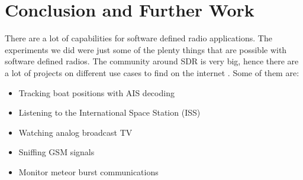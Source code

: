\documentclass[conference]{IEEEtran}
\begin{document}
\section{Conclusion and Further Work}
There are a lot of capabilities for software defined radio applications. The experiments we did were just some of the plenty things that are possible with software defined radios. The community around SDR is very big, hence there are a lot of projects on different use cases to find on the internet \cite{rtl-sdr}. Some of them are:

\begin{itemize}
	\item Tracking boat positions with AIS decoding  \cite{ais-ship-tracking}
	\item Listening to the International Space Station (ISS) \cite{iss-listening}
	\item Watching analog broadcast TV  \cite{analogue-tv-sdr}
	\item Sniffing GSM signals  \cite{analyzing-gsm}
	\item Monitor meteor burst communications  \cite{meteor-reflection}
\end{itemize}



\end{document}
